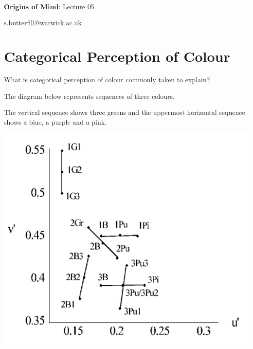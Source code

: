 \documentclass[12pt]{extarticle}
\date{}
\makeatletter
\def \ititle {Origins of Mind}
\def \isubtitle {Lecture 02}
\def \iemail{s.butterfill@warwick.ac.uk}
\makeatother
\begin{document}
\begin{multicols}{3}

\setlength\footnotesep{1em}













\def \ititle {Origins of Mind}

\def \isubtitle {Lecture 05}



\



\begin{center}

{\Large

\textbf{\ititle}: \isubtitle

}



\iemail %

\end{center}



\section{Categorical Perception of Colour}

What is categorical perception of colour commonly taken to explain?


The diagram below represents sequences of three colours.


The vertical sequence shows three greens and the uppermost horizontal sequence shows a blue, a purple and a pink.


\begin{center}


\includegraphics[scale=0.3]{daoutis_2006_fig_A1.png}



\end{center}
\end{multicols}
\end{document}
